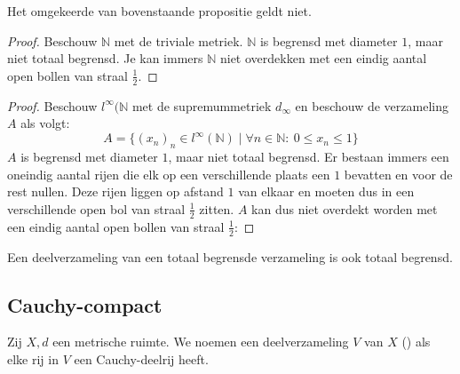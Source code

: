 \documentclass[main.tex]{subfiles}
\begin{document}
\begin{tvb}
  Het omgekeerde van bovenstaande propositie geldt niet.

  \begin{proof}
    Beschouw $\mathbb{N}$ met de triviale metriek.
    $\mathbb{N}$ is begrensd met diameter $1$, maar niet totaal begrensd.
    Je kan immers $\mathbb{N}$ niet overdekken met een eindig aantal open bollen van straal $\frac{1}{2}$.
  \end{proof}
  \begin{proof}
    Beschouw $l^{\infty}(\mathbb{N}$ met de supremummetriek $d_{\infty}$ en beschouw de verzameling $A$ als volgt:
    \[ A = \{ (x_{n})_{n} \in l^{\infty}(\mathbb{N}) \mid \forall n\in \mathbb{N}:\ 0 \le x_{n} \le 1 \} \]
    $A$ is begrensd met diameter $1$, maar niet totaal begrensd.
    Er bestaan immers een oneindig aantal rijen die elk op een verschillende plaats een $1$ bevatten en voor de rest nullen.
    Deze rijen liggen op afstand $1$ van elkaar en moeten dus in een verschillende open bol van straal $\frac{1}{2}$ zitten.
    $A$ kan dus niet overdekt worden met een eindig aantal open bollen van straal $\frac{1}{2}$:
  \end{proof}
\end{tvb}

\begin{st}
  \label{st:deelverzameling-van-totaal-begrensd-ook-totaal-begrensd}
  Een deelverzameling van een totaal begrensde verzameling is ook totaal begrensd.
\end{st}


\subsection{Cauchy-compact}
\label{sec:cauchy-compact}

\begin{de}
  Zij $X,d$ een metrische ruimte.
  We noemen een deelverzameling $V$ van $X$  () als elke rij in $V$ een Cauchy-deelrij heeft.
\end{de}
\end{document}
